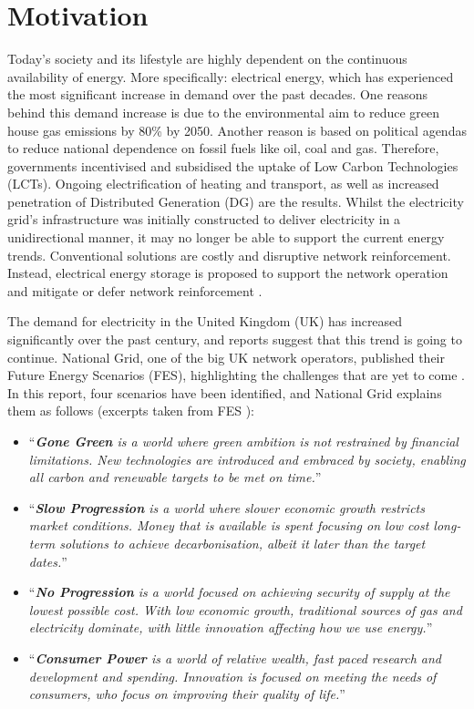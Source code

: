 \section{Motivation}
\label{ch-introduction:sec:Motivation}

Today's society and its lifestyle are highly dependent on the continuous availability of energy.
More specifically: electrical energy, which has experienced the most significant increase in demand over the past decades.
One reasons behind this demand increase is due to the environmental aim to reduce green house gas emissions by 80\% by 2050.
Another reason is based on political agendas to reduce national dependence on fossil fuels like oil, coal and gas.
Therefore, governments incentivised and subsidised the uptake of Low Carbon Technologies (LCTs).
Ongoing electrification of heating and transport, as well as increased penetration of Distributed Generation (DG) are the results.
Whilst the electricity grid's infrastructure was initially constructed to deliver electricity in a unidirectional manner, it may no longer be able to support the current energy trends.
Conventional solutions are costly and disruptive network reinforcement.
Instead, electrical energy storage is proposed to support the network operation and mitigate or defer network reinforcement \cite{Manz2012, Kleinberg2014}.

The demand for electricity in the United Kingdom (UK) has increased significantly over the past century, and reports suggest that this trend is going to continue.
National Grid, one of the big UK network operators, published their Future Energy Scenarios (FES), highlighting the challenges that are yet to come \cite{FES2015}.
In this report, four scenarios have been identified, and National Grid explains them as follows (excerpts taken from FES \cite{FES2015}):

\begin{itemize}
	\item ``\textit{\textbf{Gone Green} is a world where green ambition is not restrained by financial limitations. New technologies are introduced and embraced by society, enabling all carbon and renewable targets to be met on time.}''
	\item ``\textit{\textbf{Slow Progression} is a world where slower economic growth restricts market conditions. Money that is available is spent focusing on low cost long-term solutions to achieve decarbonisation, albeit it later than the target dates.}''
	\item ``\textit{\textbf{No Progression} is a world focused on achieving security of supply at the lowest possible cost. With low economic growth, traditional sources of gas and electricity dominate, with little innovation affecting how we use energy.}''
	\item ``\textit{\textbf{Consumer Power} is a world of relative wealth, fast paced research and development and spending. Innovation is focused on meeting the needs of consumers, who focus on improving their quality of life.}''
\end{itemize}

